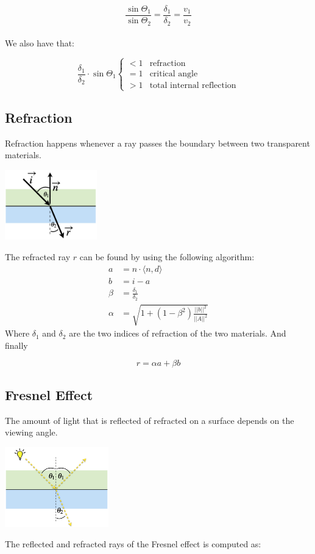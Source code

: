 \documentclass{article}
\begin{document}
\[ \frac{\sin \Theta_1}{\sin \Theta_2} = \frac{\delta_1}{\delta_2} = \frac{v_1}{v_2} \] \\
We also have that:

\[ \frac{\delta_1}{\delta_2} \cdot \sin \Theta_1 \begin{cases} < 1 & \text{refraction} \\ = 1 & \text{critical angle} \\ > 1 & \text{total internal reflection} \end{cases} \]

\subsection{Refraction}
Refraction happens whenever a ray passes the boundary between two transparent materials. \\

\begin{center}
	\includegraphics[width=4cm]{refrac.png}
\end{center}
\vspace{.3cm}
The refracted ray $r$ can be found by using the following algorithm:
\begin{align*}
	a &= n \cdot \langle n, d \rangle \\
	b &= i - a \\
	\beta &= \frac{\delta_1}{\delta_2} \\
	\alpha &= \sqrt{1 + ( 1 - \beta^2) \frac{||b||^2}{||A||^2}}
\end{align*}
Where $\delta_1$ and $\delta_2$ are the two indices of refraction of the two materials. And finally

\[ r = \alpha a + \beta b \]

\subsection{Fresnel Effect}
The amount of light that is reflected of refracted on a surface depends on the viewing angle. \\

\begin{center}
	\includegraphics[width=4.5cm]{fresnel.png}
\end{center}
\vspace{.3cm}
The reflected and refracted rays of the Fresnel effect is computed as:
\end{document}
